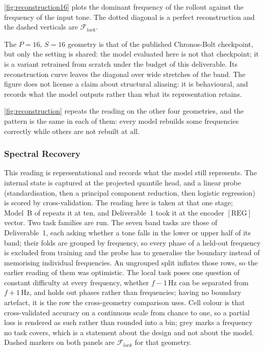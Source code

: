 \autoref{fig:reconstruction16} plots the dominant frequency of the rollout against the frequency of the input tone. The dotted diagonal is a perfect reconstruction and the dashed verticals are $\mathcal F_{lock}$.

The $P{=}16,\,S{=}16$ geometry is that of the published Chronos-Bolt checkpoint, but only the setting is shared: the model evaluated here is not that checkpoint; it is a variant retrained from scratch under the budget of this deliverable. Its reconstruction curve leaves the diagonal over wide stretches of the band. The figure does not license a claim about structural aliasing: it is behavioural, and records what the model outputs rather than what its representation retains.

\autoref{fig:reconstruction} repeats the reading on the other four geometries, and the pattern is the same in each of them: every model rebuilds some frequencies correctly while others are not rebuilt at all.

\subsubsection{Spectral Recovery}
This reading is representational and records what the model still represents. The internal state is captured at the projected quantile head, and a linear probe (standardisation, then a principal component reduction, then logistic regression) is scored by cross-validation. The reading here is taken at that one stage; Model~B of  repeats it at ten, and Deliverable~1 took it at the encoder $[\mathrm{REG}]$ vector. Two task families are run. The seven band tasks are those of Deliverable~1, each asking whether a tone falls in the lower or upper half of its band; their folds are grouped by frequency, so every phase of a held-out frequency is excluded from training and the probe has to generalise the boundary instead of memorising individual frequencies. An ungrouped split inflates those rows, so the earlier reading of them was optimistic. The local task poses one question of constant difficulty at every frequency, whether $f-1$\,Hz can be separated from $f+1$\,Hz, and holds out phases rather than frequencies; having no boundary artefact, it is the row the cross-geometry comparison uses. Cell colour is that cross-validated accuracy on a continuous scale from chance to one, so a partial loss is rendered as such rather than rounded into a bin; grey marks a frequency no task covers, which is a statement about the design and not about the model. Dashed markers on both panels are $\mathcal F_{lock}$ for that geometry.

